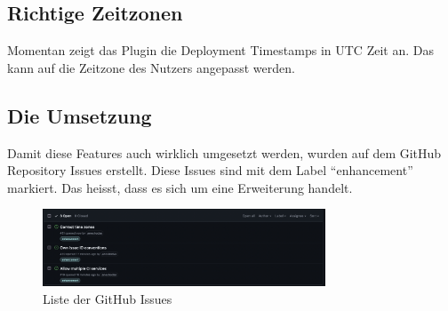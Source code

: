 \subsection{Richtige Zeitzonen}
Momentan zeigt das Plugin die Deployment Timestamps in UTC Zeit an. Das kann auf die Zeitzone des Nutzers
angepasst werden.
\subsection{Die Umsetzung}
Damit diese Features auch wirklich umgesetzt werden, wurden auf dem GitHub Repository Issues erstellt. Diese
Issues sind mit dem Label \enquote{enhancement} markiert. Das heisst, dass es sich um eine Erweiterung handelt.
\begin{figure}[H]
    \centering
    \includegraphics[width=0.75\textwidth]{images/misc/issues.png}
    \caption[Ein Screenshot von den aufgelisteten GitHub Issues]{Liste der GitHub Issues}
    \label{fig:issues}
\end{figure}
